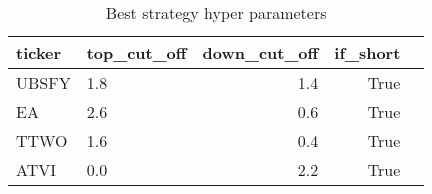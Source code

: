 \begin{table}
\centering
\caption{Best strategy hyper parameters}
\begin{tabular}{llrrl}
\toprule
 ticker &  top\_cut\_off &  down\_cut\_off &  if\_short \\
\midrule
  UBSFY &          1.8 &           1.4 &      True \\
     EA &          2.6 &           0.6 &      True \\
   TTWO &          1.6 &           0.4 &      True \\
   ATVI &          0.0 &           2.2 &      True \\
\bottomrule
\end{tabular}
\end{table}
